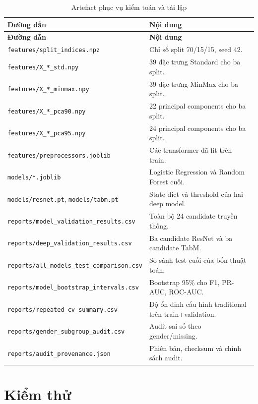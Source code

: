 \documentclass[12pt,a4paper,oneside]{report}
\newcommand{\code}[1]{\texttt{#1}}
\begin{document}
\begin{longtable}{p{} p{}}
\caption{Artefact phục vụ kiểm toán và tái lập}\label{tab:artifacts}\\
\toprule
\textbf{Đường dẫn} & \textbf{Nội dung} \\
\midrule
\endfirsthead
\toprule
\textbf{Đường dẫn} & \textbf{Nội dung} \\
\midrule
\endhead
\bottomrule
\endfoot
\code{features/split\_indices.npz} & Chỉ số split 70/15/15, seed 42. \\
\code{features/X\_*\_std.npy} & 39 đặc trưng Standard cho ba split. \\
\code{features/X\_*\_minmax.npy} & 39 đặc trưng MinMax cho ba split. \\
\code{features/X\_*\_pca90.npy} & 22 principal components cho ba split. \\
\code{features/X\_*\_pca95.npy} & 24 principal components cho ba split. \\
\code{features/preprocessors.joblib} & Các transformer đã fit trên train. \\
\code{models/*.joblib} & Logistic Regression và Random Forest cuối. \\
\code{models/resnet.pt}, \code{models/tabm.pt} & State dict và threshold của hai deep model. \\
\code{reports/model\_validation\_results.csv} & Toàn bộ 24 candidate truyền thống. \\
\code{reports/deep\_validation\_results.csv} & Ba candidate ResNet và ba candidate TabM. \\
\code{reports/all\_models\_test\_comparison.csv} & So sánh test cuối của bốn thuật toán. \\
\code{reports/model\_bootstrap\_intervals.csv} & Bootstrap 95\% cho F1, PR-AUC, ROC-AUC. \\
\code{reports/repeated\_cv\_summary.csv} & Độ ổn định cấu hình traditional trên train+validation. \\
\code{reports/gender\_subgroup\_audit.csv} & Audit sai số theo gender/missing. \\
\code{reports/audit\_provenance.json} & Phiên bản, checksum và chính sách audit. \\
\end{longtable}

\section{Kiểm thử}
\end{document}
